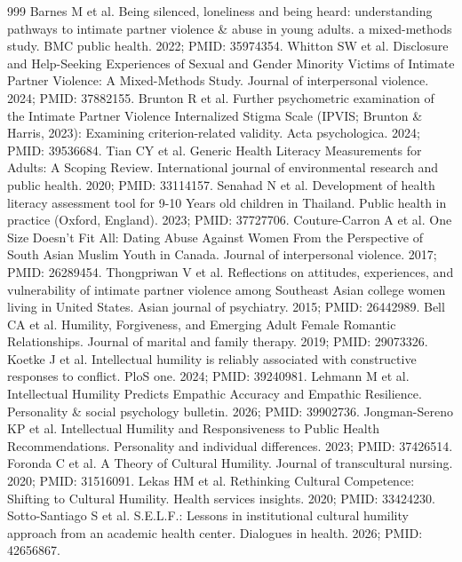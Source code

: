 \begin{thebibliography}{999}
 Barnes M et al. Being silenced, loneliness and being heard: understanding pathways to intimate partner violence \& abuse in young adults. a mixed-methods study. BMC public health. 2022; PMID: 35974354.
 Whitton SW et al. Disclosure and Help-Seeking Experiences of Sexual and Gender Minority Victims of Intimate Partner Violence: A Mixed-Methods Study. Journal of interpersonal violence. 2024; PMID: 37882155.
 Brunton R et al. Further psychometric examination of the Intimate Partner Violence Internalized Stigma Scale (IPVIS; Brunton \& Harris, 2023): Examining criterion-related validity. Acta psychologica. 2024; PMID: 39536684.
 Tian CY et al. Generic Health Literacy Measurements for Adults: A Scoping Review. International journal of environmental research and public health. 2020; PMID: 33114157.
 Senahad N et al. Development of health literacy assessment tool for 9-10 Years old children in Thailand. Public health in practice (Oxford, England). 2023; PMID: 37727706.
 Couture-Carron A et al. One Size Doesn't Fit All: Dating Abuse Against Women From the Perspective of South Asian Muslim Youth in Canada. Journal of interpersonal violence. 2017; PMID: 26289454.
 Thongpriwan V et al. Reflections on attitudes, experiences, and vulnerability of intimate partner violence among Southeast Asian college women living in United States. Asian journal of psychiatry. 2015; PMID: 26442989.
 Bell CA et al. Humility, Forgiveness, and Emerging Adult Female Romantic Relationships. Journal of marital and family therapy. 2019; PMID: 29073326.
 Koetke J et al. Intellectual humility is reliably associated with constructive responses to conflict. PloS one. 2024; PMID: 39240981.
 Lehmann M et al. Intellectual Humility Predicts Empathic Accuracy and Empathic Resilience. Personality \& social psychology bulletin. 2026; PMID: 39902736.
 Jongman-Sereno KP et al. Intellectual Humility and Responsiveness to Public Health Recommendations. Personality and individual differences. 2023; PMID: 37426514.
 Foronda C et al. A Theory of Cultural Humility. Journal of transcultural nursing. 2020; PMID: 31516091.
 Lekas HM et al. Rethinking Cultural Competence: Shifting to Cultural Humility. Health services insights. 2020; PMID: 33424230.
 Sotto-Santiago S et al. S.E.L.F.: Lessons in institutional cultural humility approach from an academic health center. Dialogues in health. 2026; PMID: 42656867.

\end{thebibliography}
